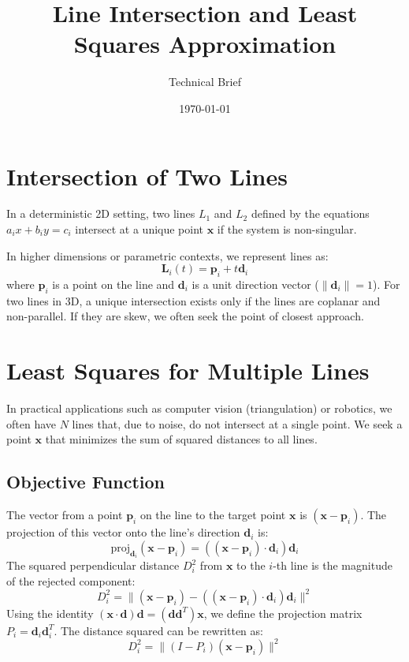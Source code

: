 \documentclass[11pt, a4paper]{article}
\title{Line Intersection and Least Squares Approximation}
\author{Technical Brief}
\date{\today}
\begin{document}
\maketitle

\section{Intersection of Two Lines}
In a deterministic 2D setting, two lines $L_1$ and $L_2$ defined by the equations $a_i x + b_i y = c_i$ intersect at a unique point $\mathbf{x}$ if the system is non-singular. 

In higher dimensions or parametric contexts, we represent lines as:
\begin{equation}
    \mathbf{L}_i(t) = \mathbf{p}_i + t\mathbf{d}_i
\end{equation}
where $\mathbf{p}_i$ is a point on the line and $\mathbf{d}_i$ is a unit direction vector ($\|\mathbf{d}_i\| = 1$). For two lines in 3D, a unique intersection exists only if the lines are coplanar and non-parallel. If they are skew, we often seek the point of closest approach.

\section{Least Squares for Multiple Lines}
In practical applications such as computer vision (triangulation) or robotics, we often have $N$ lines that, due to noise, do not intersect at a single point. We seek a point $\mathbf{x}$ that minimizes the sum of squared distances to all lines.

\subsection{Objective Function}
The vector from a point $\mathbf{p}_i$ on the line to the target point $\mathbf{x}$ is $(\mathbf{x} - \mathbf{p}_i)$. The projection of this vector onto the line's direction $\mathbf{d}_i$ is:
\begin{equation}
    \text{proj}_{\mathbf{d}_i}(\mathbf{x} - \mathbf{p}_i) = ((\mathbf{x} - \mathbf{p}_i) \cdot \mathbf{d}_i)\mathbf{d}_i
\end{equation}
The squared perpendicular distance $D_i^2$ from $\mathbf{x}$ to the $i$-th line is the magnitude of the rejected component:
\begin{equation}
    D_i^2 = \|(\mathbf{x} - \mathbf{p}_i) - ((\mathbf{x} - \mathbf{p}_i) \cdot \mathbf{d}_i)\mathbf{d}_i\|^2
\end{equation}
Using the identity $(\mathbf{x} \cdot \mathbf{d})\mathbf{d} = (\mathbf{d}\mathbf{d}^T)\mathbf{x}$, we define the projection matrix $P_i = \mathbf{d}_i\mathbf{d}_i^T$. The distance squared can be rewritten as:
\begin{equation}
    D_i^2 = \|(I - P_i)(\mathbf{x} - \mathbf{p}_i)\|^2
\end{equation}
\end{document}
